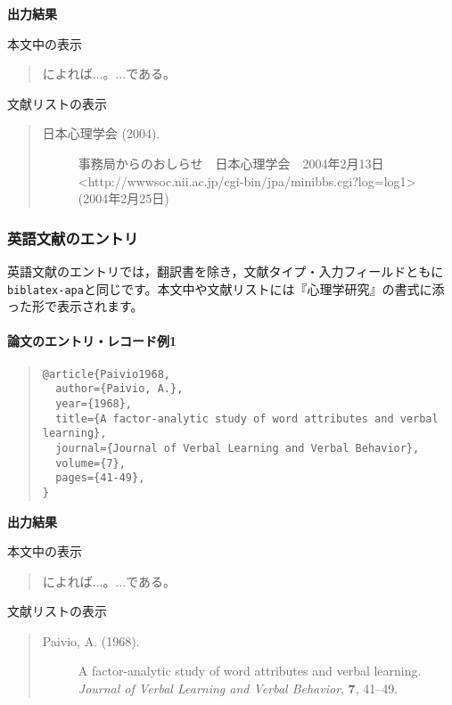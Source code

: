 \documentclass[12pt]{ltjsarticle}
\begin{document}
\textbf{出力結果}

本文中の表示
\begin{quote}
\textcite{JPA2004}によれば...。...である\parencite{JPA2004}。
\end{quote}

文献リストの表示
\begin{quote}
\begin{description}
  \item[\textrm{日本心理学会 (2004).}]事務局からのおしらせ　日本心理学会　2004年2月13日 <http://wwwsoc.nii.ac.jp/cgi-bin/jpa/minibbs.cgi?log=log1>\\
  (2004年2月25日)
\end{description}
\end{quote}

\subsubsection{英語文献のエントリ}
英語文献のエントリでは，翻訳書を除き，文献タイプ・入力フィールドともに\texttt{biblatex-apa}と同じです。本文中や文献リストには『心理学研究』の書式に添った形で表示されます。


\paragraph{論文のエントリ・レコード例1}

\begin{quote}
\begin{verbatim}
@article{Paivio1968,
  author={Paivio, A.},
  year={1968},
  title={A factor-analytic study of word attributes and verbal learning},
  journal={Journal of Verbal Learning and Verbal Behavior},
  volume={7},
  pages={41-49},
}
\end{verbatim}
\end{quote}

\textbf{出力結果}

本文中の表示
\begin{quote}
\textcite{Paivio1968}によれば...。...である\parencite{Paivio1968}。
\end{quote}

文献リストの表示
\begin{quote}
\begin{description}
  \item[\textrm{Paivio, A. (1968).}]A factor-analytic study of word attributes and verbal learning. \textit{Journal of Verbal Learning and Verbal Behavior}, \textbf{7}, 41--49.
\end{description}
\end{quote}
\end{document}
